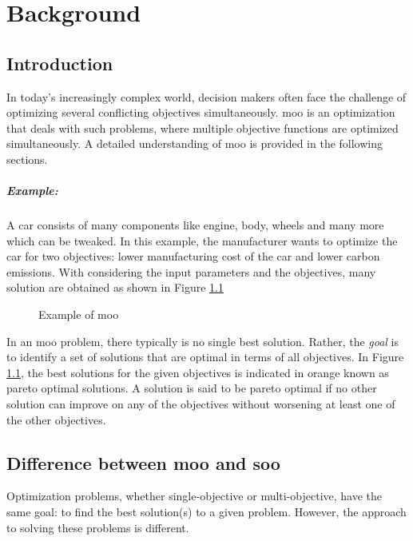 \chapter{Background}

\section{Introduction} \label{what is moo}
In today's increasingly complex world, decision makers often face the challenge of optimizing several conflicting objectives simultaneously. \acrfull{moo} 
is an optimization that deals with such problems, where multiple objective functions are optimized simultaneously. A detailed understanding of \acrshort{moo} 
is provided in the following sections.

\paragraph{Example:}
A car consists of many components like engine, body, wheels and many more which can be
tweaked. In this example, the manufacturer wants to optimize the car for two objectives: lower manufacturing cost of the car and lower carbon emissions. With 
considering the input parameters and the objectives, many solution are obtained as shown in Figure \ref{moo}

\begin{figure}[!h]
	\begin{center}
		
	\end{center}
    \caption{Example of \acrshort{moo}}
    \label{moo}
\end{figure}
In an \acrshort{moo} problem, there typically is no single best solution. Rather, the \textit{goal} is to identify a set of solutions that are optimal in terms 
of all objectives. In Figure \ref{moo}, the best solutions for the given objectives is indicated in orange known as pareto optimal solutions. A solution is said 
to be pareto optimal if no other solution can improve on any of the objectives without worsening at least one of the other objectives\cite{Benson2009}.

\section{Difference between \acrlong{moo} and \acrlong{soo}}
Optimization problems, whether single-objective or multi-objective, have the same goal: to find the best solution(s) to a given problem. However, the approach
to solving these problems is different. 

